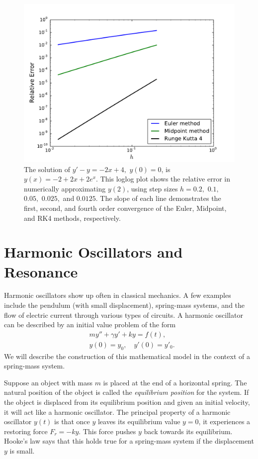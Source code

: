 \begin{figure}[ht]
\centering
\includegraphics[width=\textwidth]{relative_error.pdf}
\caption{The solution of $y' -y= -2x+4,$ $y(0) = 0$, is $y(x) = -2+2x + 2e^x.$ This loglog plot shows the relative error in numerically approximating $y(2)$, using step sizes $h = 0.2,$ $0.1,$ $0.05,$ $0.025,$ and $0.0125$. The slope of each line demonstrates the first, second, and fourth order convergence of the Euler, Midpoint, and RK4 methods, respectively.}
\label{ivp:relative_error}
\end{figure}


\section*{Harmonic Oscillators and Resonance} 
Harmonic oscillators show up often in classical mechanics.
A few examples include the pendulum (with small
 displacement), spring-mass systems, and the flow of electric current through various types of circuits.
A harmonic oscillator can be described by an initial value problem of the form
\begin{align*}
	&{}my'' + \gamma y' + ky = f(t) ,\\
	&{}y(0) = y_0,\quad
	y'(0) = y'_0.
\end{align*}
We will describe the construction of this mathematical model in the context of a spring-mass system.

Suppose an object with mass $m$ is placed at the end of a horizontal spring.
The natural position of the object is called the \textit{equilibrium position} for the system.
If the object is displaced from its equilibrium position and given an initial velocity,
it will act like a harmonic oscillator.
The principal property of a harmonic oscillator $y(t)$ is that once $y$ leaves its equilibrium value $y = 0$, it experiences a restoring force $F_r = -ky.$
This force pushes $y$ back towards its equilibrium.
Hooke's law says that this holds true for a
spring-mass system if the displacement $y$ is small.

